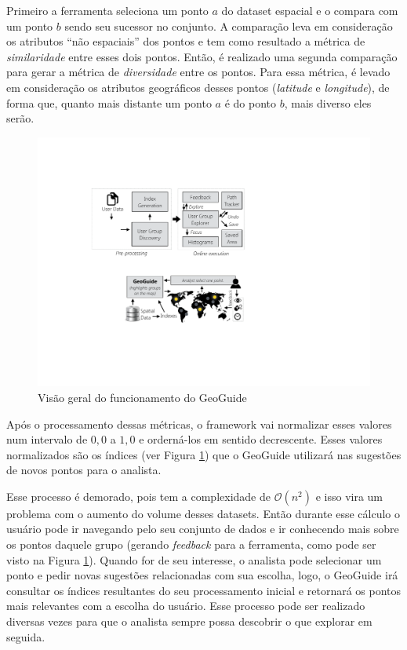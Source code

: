 Primeiro a ferramenta seleciona um ponto $a$ do dataset espacial e o compara com um ponto $b$ sendo seu sucessor no conjunto. A comparação leva em consideração os atributos ``não espaciais'' dos pontos e tem como resultado a métrica de \textit{similaridade} entre esses dois pontos. Então, é realizado uma segunda comparação para gerar a métrica de \textit{diversidade} entre os pontos. Para essa métrica, é levado em consideração os atributos geográficos desses pontos (\textit{latitude} e \textit{longitude}), de forma que, quanto mais distante um ponto $a$ é do ponto $b$, mais diverso eles serão.  

\begin{figure}[h]
	\centering
	\includegraphics[width=\textwidth]{images/geoguide-pre-processamento.pdf}
	\caption{Visão geral do funcionamento do GeoGuide}
	\label{fig:geoguide-pre-processamento}
	\vspace{-10pt}
\end{figure}

Após o processamento dessas métricas, o framework vai normalizar esses valores num intervalo de $0,0$ a $1,0$ e orderná-los em sentido decrescente. Esses valores normalizados são os índices (ver Figura \ref{fig:geoguide-pre-processamento}) que o GeoGuide utilizará nas sugestões de novos pontos para o analista.

Esse processo é demorado, pois tem a complexidade de $\mathcal{O}(n^{2})$ e isso vira um problema com o aumento do volume desses datasets. Então durante esse cálculo o usuário pode ir navegando pelo seu conjunto de dados e ir conhecendo mais sobre os pontos daquele grupo (gerando \textit{feedback} para a ferramenta, como pode ser visto na Figura \ref{fig:geoguide-pre-processamento}). Quando for de seu interesse, o analista pode selecionar um ponto e pedir novas sugestões relacionadas com sua escolha, logo, o GeoGuide irá consultar os índices resultantes do seu processamento inicial e retornará os pontos mais relevantes com a escolha do usuário. Esse processo pode ser realizado diversas vezes para que o analista sempre possa descobrir o que explorar em seguida.

